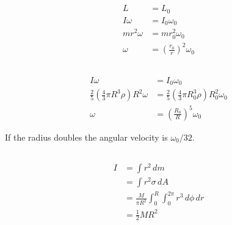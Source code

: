 \documentclass{article}
\begin{document}
\setcounter{subsection}{24}
\subsection{}

\begin{align*}
  L            & = L_0                                     \\
  I \omega     & = I_0 \omega_0                            \\
  m r^2 \omega & = m r_0^2 \omega_0                        \\
  \omega       & = \left( \frac{r_0}{r} \right)^2 \omega_0
\end{align*}

\setcounter{subsection}{28}
\subsection{}

\begin{align*}
  I \omega                                                       & = I_0 \omega_0                                                         \\
  \frac{2}{5} \left( \frac{4}{3} \pi R^3 \rho \right) R^2 \omega & = \frac{2}{5} \left( \frac{4}{3} \pi R_0^3 \rho \right) R_0^2 \omega_0 \\
  \omega                                                         & = \left( \frac{R_0}{R} \right)^5 \omega_0
\end{align*}

If the radius doubles the angular velocity is $\omega_0 / 32$.

\setcounter{subsection}{30}
\subsection{}

\begin{align*}
  I & = \int r^2 \,d m                                               \\
    & = \int r^2 \sigma \,d A                                        \\
    & = \frac{M}{\pi R^2} \int_0^R \int_0^{2 \pi} r^3 \,d \phi \,d r \\
    & = \frac{1}{2} M R^2
\end{align*}

\setcounter{subsection}{32}
\subsection{}
\end{document}

